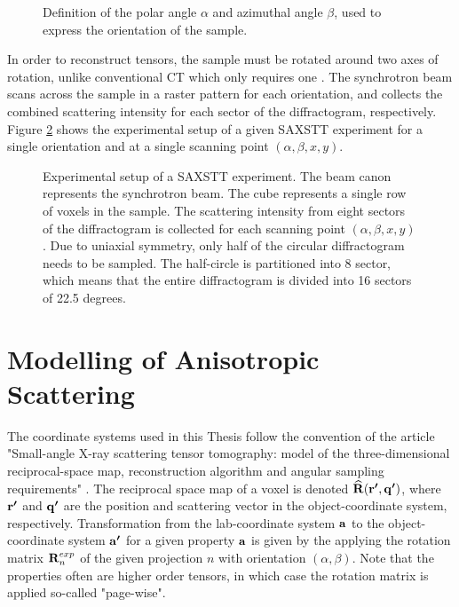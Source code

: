 \begin{figure}[h!]
    \centering
    
    \caption{Definition of the polar angle $\alpha$ and azimuthal angle $\beta$, used to express the orientation of the sample.}
    \label{fig:orientations}
\end{figure}

In order to reconstruct tensors, the sample must be rotated around two axes of rotation, unlike conventional CT which only requires one \cite{liebi2018small}.
The synchrotron beam scans across the sample in a raster pattern for each orientation, and collects the combined scattering intensity for each sector of the diffractogram, respectively.
Figure \ref{fig:experimental_setup} shows the experimental setup of a given SAXSTT experiment for a single orientation and at a single scanning point $(\alpha, \beta,x,y)$.

\begin{figure}
    \centering
    
    \caption{Experimental setup of a SAXSTT experiment. The beam canon represents the synchrotron beam. The cube represents a single row of voxels in the sample.
        The scattering intensity from eight sectors of the diffractogram is collected for each scanning point $(\alpha, \beta,x,y)$.
        Due to uniaxial symmetry, only half of the circular diffractogram needs to be sampled. The half-circle is partitioned into 8 sector, which means that the entire diffractogram is divided into 16 sectors of 22.5 degrees.}
    \label{fig:experimental_setup}
\end{figure}



\section{Modelling of Anisotropic Scattering}
The coordinate systems used in this Thesis follow the convention of the article "Small-angle X-ray scattering tensor tomography:
model of the three-dimensional reciprocal-space
map, reconstruction algorithm and angular
sampling requirements" \cite{liebi2018small}.
The reciprocal space map of a voxel is denoted $\bm{\mathrm{\widehat{R}}}(\bm{\mathrm{r'}}, \bm{\mathrm{q'}})$,
where $\bm{\mathrm{r'}}$ and $\bm{\mathrm{q'}}$ are the position and scattering vector in the object-coordinate system, respectively.
Transformation from the lab-coordinate system $\bm{\mathrm{a}}$ to the object-coordinate system $\bm{\mathrm{a'}}$ for a given property $\bm{\mathrm{a}}$
is given by the applying the rotation matrix $\bm{\mathrm{R}}_{n}^{exp}$ of the given projection $n$ with orientation $\left(\alpha,\beta\right)$.
Note that the properties often are higher order tensors, in which case the rotation matrix is applied so-called "page-wise".

